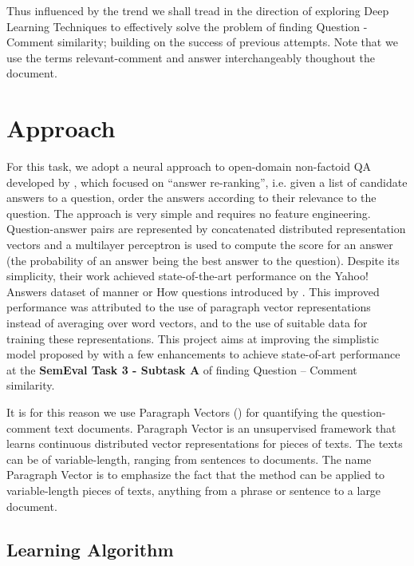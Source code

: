 \documentclass[12pt, a4paper, oneside]{Thesis} %
\newcommand{\mychapter}[2]{
    \setcounter{chapter}{#1}
    \setcounter{section}{0}
    \chapter*{#2}
    \addcontentsline{toc}{chapter}{#2}
    \lhead{\emph{#2}}
}
\begin{document}
Thus influenced by the trend we shall tread in the direction of exploring Deep Learning Techniques to effectively solve the problem of finding Question - Comment similarity; building on the success of previous attempts. Note that we use the terms relevant-comment and answer interchangeably thoughout the document.



\mychapter{3}{Approach}

For this task, we adopt a neural approach to open-domain non-factoid QA developed by \cite{bogdanova2016we}, which focused on “answer re-ranking”, i.e. given a list of candidate answers to a question, order the answers according to their relevance to the question. The approach is very simple and requires no feature engineering. Question-answer pairs are represented by concatenated distributed representation vectors and a multilayer perceptron is used to compute the score for an answer (the probability of an answer being the best answer to the question). Despite its simplicity, their work achieved state-of-the-art performance on the Yahoo! Answers dataset of manner or How questions introduced by \cite{jansen2014discourse}. This improved performance was attributed to the use of paragraph vector representations instead of averaging over word vectors, and to the use of suitable data for training these representations. This project aims at improving the simplistic model proposed by \cite{bogdanova2016we} with a few enhancements to achieve state-of-art performance at the \textbf{SemEval Task 3 - Subtask A} of finding Question -- Comment similarity.

It is for this reason we use Paragraph Vectors (\cite{le2014distributed}) for quantifying the question-comment text documents. Paragraph Vector is an unsupervised framework that learns continuous distributed vector representations for pieces of texts. The texts can be of variable-length, ranging from sentences to documents. The name Paragraph Vector is to emphasize the fact that the method can be applied to variable-length pieces of texts, anything from a phrase or sentence to a large document.

\section{Learning Algorithm}
\label{section:learning-algo}
\end{document}
